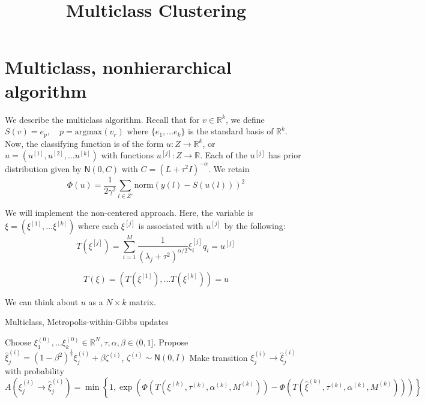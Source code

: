 \documentclass{siamart1116}
\title{Multiclass Clustering}
\author{\TheAuthors}
\date{}
\begin{document}
\maketitle
\setlength{\unitlength}{1in}
\setlength{\parindent}{0in}
\section{Multiclass, nonhierarchical algorithm}
    We describe the multiclass algorithm. Recall that for $v \in \mathbb{R}^k$, we define $S(v) = e_p, \quad p = \text{argmax} (v_r)$ where $\{e_1, \ldots e_k\}$ is the standard basis of $\mathbb{R}^k$. Now, the classifying function is of the form $u: Z \to \mathbb{R}^k$, or $u = (u^{[1]}, u^{[2]}, \ldots u^{[k]})$ with functions $u^{[j]}: Z \to \mathbb{R}$. Each of the $u^{[j]}$ has prior distribution given by $\mathsf{N}(0, C)$ with $C = (L + \tau^2 I)^{-\alpha}$. We retain
    \[ \Phi(u) = \frac{1}{2\gamma^2}\sum_{l \in Z'} \text{norm}(y(l) - S(u(l)))^2 \]

    We will implement the non-centered approach. Here, the variable is $\xi = (\xi^{[1]}, \ldots \xi^{[k]})$ where each $\xi^{[j]}$ is associated with $u^{[j]}$ by the following:
    \[T(\xi^{[j]}) = \sum_{i=1}^M \frac{1}{(\lambda_j + \tau^2)^{\alpha/2}} \xi^{[j]}_i q_i = u^{[j]}\]
    
    \begin{equation}
    \label{eqn:multiclass_T}
    T(\xi) = (T(\xi^{[1]}), \ldots T(\xi^{[k]}) ) = u
    \end{equation}

    We can think about $u$ as a $N \times k$ matrix.

    \begin{algorithm}

    \caption{Multiclass, Metropolis-within-Gibbs updates}
    \label{alg:hier_t_a_M}
    \begin{algorithmic}
    \State Choose $\xi^{(0)}_1, \ldots \xi^{(0)}_k \in \mathbb{R}^N, \tau, \alpha, \beta \in (0, 1]$.
            \State Propose $\hat\xi^{(i)}_j = (1-\beta^2)^{\frac{1}{2}}\xi^{(i)}_j + \beta \zeta^{(i)}$, $\zeta^{(i)} \sim \mathsf{N}(0, I)$
            \State Make transition $\xi^{(i)}_j \to \hat\xi^{(i)}_j$ with probability
            \[ A(\xi^{(i)}_j \to \hat\xi^{(i)}_j) = \min\left\{1, \exp\left(\Phi(T(\xi^{(k)},\tau^{(k)},\alpha^{(k)}, M^{(k)})) - \Phi(T(\hat\xi^{(k)},\tau^{(k)},\alpha^{(k)}, M^{(k)}))\right) \right\}\]

        \EndFor
    \EndFor
    
    \end{algorithmic}
    \end{algorithm}




\end{document}
